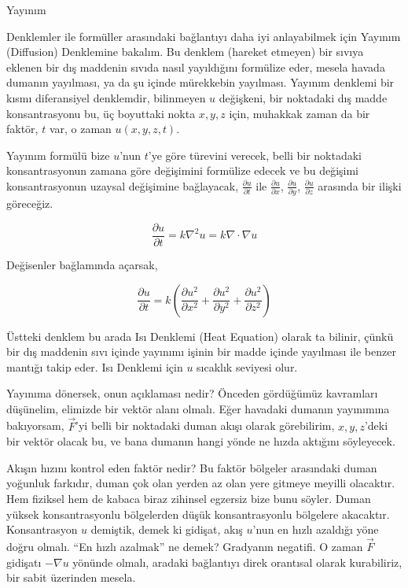 \documentclass[12pt,fleqn]{article}\usepackage{../../common}
\begin{document}
Yayınım

Denklemler ile formüller arasındaki bağlantıyı daha iyi anlayabilmek için
Yayınım (Diffusion) Denklemine bakalım. Bu denklem (hareket etmeyen) bir sıvıya
eklenen bir dış maddenin sıvıda nasıl yayıldığını formülize eder, mesela havada
dumanın yayılması, ya da şu içinde mürekkebin yayılması. Yayınım denklemi bir
kısmı diferansiyel denklemdir, bilinmeyen $u$ değişkeni, bir noktadaki dış madde
konsantrasyonu bu, üç boyuttaki nokta $x,y,z$ için, muhakkak zaman da bir
faktör, $t$ var, o zaman $u(x,y,z,t)$.

Yayınım formülü bize $u$'nun $t$'ye göre türevini verecek, belli bir noktadaki
konsantrasyonun zamana göre değişimini formülize edecek ve bu değişimi
konsantrasyonun uzaysal değişimine bağlayacak, $\frac{\partial u}{\partial t}$
ile $\frac{\partial u}{\partial x}$, $\frac{\partial u}{\partial y}$,
$\frac{\partial u}{\partial z}$ arasında bir ilişki göreceğiz.

$$
\frac{\partial u}{\partial t} =
k \nabla^2 u =
k \nabla \cdot \nabla u
$$

Değisenler bağlamında açarsak,

$$
\frac{\partial u}{\partial t} = k \left(
\frac{\partial u^2}{\partial x^2} +
\frac{\partial u^2}{\partial y^2} +
\frac{\partial u^2}{\partial z^2}
\right)
$$

Üstteki denklem bu arada Isı Denklemi (Heat Equation) olarak ta bilinir, çünkü
bir dış maddenin sıvı içinde yayınımı işinin bir madde içinde yayılması ile
benzer mantığı takip eder. Isı Denklemi için $u$ sıcaklık seviyesi olur.

Yayınıma dönersek, onun açıklaması nedir? Önceden gördüğümüz kavramları
düşünelim, elimizde bir vektör alanı olmalı. Eğer havadaki dumanın yayınımına
bakıyorsam, $\vec{F}$'yi belli bir noktadaki duman akışı olarak görebilirim,
$x,y,z$'deki bir vektör olacak bu, ve bana dumanın hangi yönde ne hızda aktığını
söyleyecek.

Akışın hızını kontrol eden faktör nedir? Bu faktör bölgeler arasındaki duman
yoğunluk farkıdır, duman çok olan yerden az olan yere gitmeye meyilli olacaktır.
Hem fiziksel hem de kabaca biraz zihinsel egzersiz bize bunu söyler. Duman
yüksek konsantrasyonlu bölgelerden düşük konsantrasyonlu bölgelere akacaktır.
Konsantrasyon $u$ demiştik, demek ki gidişat, akış $u$'nun en hızlı azaldığı
yöne doğru olmalı. ``En hızlı azalmak'' ne demek? Gradyanın negatifi.  O zaman
$\vec{F}$ gidişatı $-\nabla u$ yönünde olmalı, aradaki bağlantıyı direk
orantısal olarak kurabiliriz, bir sabit üzerinden mesela.
\end{document}
